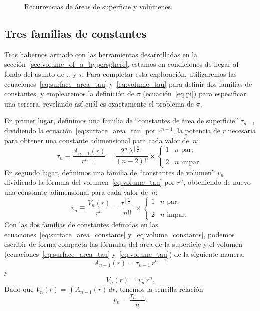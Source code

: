 \begin{figure}
\caption{Recurrencias de áreas de superficie y volúmenes.\label{fig:Nspheres}}
\end{figure}





  \subsection{Tres familias de constantes} %
  \label{sec:three_families_of_constants}

Tras habernos armado con las herramientas desarrolladas en la sección~\ref{sec:volume_of_a_hypersphere}, estamos en condiciones de llegar al fondo del asunto de $\pi$ y $\tau$. Para completar esta exploración, utilizaremos las ecuaciones~\eqref{eq:surface_area_tau} y~\eqref{eq:volume_tau} para definir dos familias de constantes, y emplearemos la definición de $\pi$ (ecuación~\eqref{eq:pi}) para especificar una tercera, revelando así cuál es exactamente el problema de $\pi$.

En primer lugar, definimos una familia de ``constantes de área de superficie'' $\tau_{n-1}$ dividiendo la ecuación~\eqref{eq:surface_area_tau} por $r^{n-1}$, la potencia de $r$ necesaria para obtener una constante adimensional para cada valor de~$n$:
\begin{equation}
\label{eq:surface_area_constants}
\tau_n \equiv \frac{A_{n-1}(r)}{r^{n-1}} = \frac{2^n\,\lambda^{\left\lfloor \frac{n}{2} \right\rfloor}}{(n-2)!!}\times 
\begin{cases}
  1 & n \text{ par}; \\ \\
  2 & n \text{ impar}.
\end{cases}
\end{equation}
En segundo lugar, definimos una familia de ``constantes de volumen'' $v_n$ dividiendo la fórmula del volumen~\eqref{eq:volume_tau} por $r^n$, obteniendo de nuevo una constante adimensional para cada valor de~$n$:
\begin{equation}
\label{eq:volume_constants}
v_n \equiv \frac{V_n(r)}{r^n} = \frac{\tau^{\left\lfloor \frac{n}{2} \right\rfloor}}{n!!} \times
\begin{cases}
  1 & n \text{ par}; \\ \\
  2 & n \text{ impar}.
\end{cases}
\end{equation}
Con las dos familias de constantes definidas en las ecuaciones~\eqref{eq:surface_area_constants} y~\eqref{eq:volume_constants}, podemos escribir de forma compacta las fórmulas del área de la superficie y el volumen (ecuaciones~\eqref{eq:surface_area_tau} y~\eqref{eq:volume_tau}) de la siguiente manera:
\[ A_{n-1}(r) = \tau_{n-1}\,r^{n-1} \]
y
\[ V_n(r) = v_n\,r^n. \]
Dado que $V_n(r) = \int A_{n-1}(r)\,dr$, tenemos la sencilla relación
\[
v_n = \frac{\tau_{n-1}}{n}.
\]

